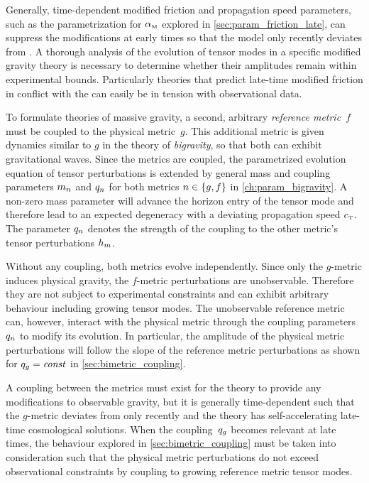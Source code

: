 Generally, time-dependent modified friction and propagation speed parameters, such as the parametrization for \({\alpha_{\textnormal{\tiny{M}}}}\) explored in \autoref{sec:param_friction_late}, can suppress the modifications at early times so that the model only recently deviates from \LCDM{}. A thorough analysis of the evolution of tensor modes in a specific modified gravity theory is necessary to determine whether their amplitudes remain within experimental bounds. Particularly theories that predict late-time modified friction in conflict with the  can easily be in tension with observational data.

To formulate theories of massive gravity, a second, arbitrary \emph{reference metric}~\(f\) must be coupled to the physical metric~\(g\). This additional metric is given dynamics similar to \(g\) in the theory of \emph{bigravity}, so that both can exhibit gravitational waves. Since the metrics are coupled, the parametrized evolution equation of tensor perturbations is extended by general mass and coupling parameters \(m_{n}\) and \(q_{n}\) for both metrics \(n \in \cbr{g,f}\) in \autoref{ch:param_bigravity}. A non-zero mass parameter will advance the horizon entry of the tensor mode and therefore lead to an expected degeneracy with a deviating propagation speed \({c_{\textnormal{\tiny{T}}}}\). The parameter \(q_{n}\) denotes the strength of the coupling to the other metric's tensor perturbations \(h_{m}\).

Without any coupling, both metrics evolve independently. Since only the \(g\)-metric induces physical gravity, the \(f\)-metric perturbations are unobservable. Therefore they are not subject to experimental constraints and can exhibit arbitrary behaviour including growing tensor modes. The unobservable reference metric can, however, interact with the physical metric through the coupling parameters~\(q_{n}\) to modify its evolution. In particular, the amplitude of the physical metric perturbations will follow the slope of the reference metric perturbations as shown for \(q_{g}=\textnormal{\textit{const}}\) in \autoref{sec:bimetric_coupling}.

A coupling between the metrics must exist for the theory to provide any modifications to observable gravity, but it is generally time-dependent such that the \(g\)-metric deviates from \LCDM{} only recently and the theory has self-accelerating late-time cosmological solutions. When the coupling~\(q_{g}\) becomes relevant at late times, the behaviour explored in \autoref{sec:bimetric_coupling} must be taken into consideration such that the physical metric perturbations do not exceed observational constraints by coupling to growing reference metric tensor modes.

